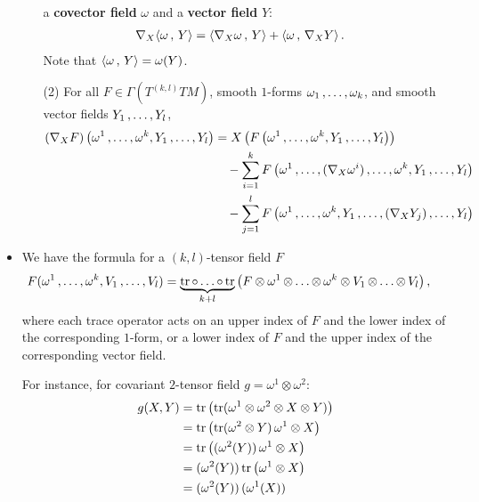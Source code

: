 \documentclass[11pt]{article}
\begin{document}
\begin{itemize}
\begin{proposition}
\begin{enumerate}
a \textbf{covector field} $\omega$ and a \textbf{vector field} $Y$:
\begin{align*}
\nabla_{X}{\left\langle \omega\,,\, Y \right\rangle} &= \left\langle \nabla_{X}{\omega}\,,\, Y \right\rangle + \left\langle \omega\,,\, \nabla_{X}{Y} \right\rangle.
\end{align*} Note that $\left\langle \omega\,,\, Y \right\rangle= \omega(Y)$.
\item[(2)] For all $F\in \Gamma(T^{(k,l)}TM)$, smooth $1$-forms $\omega_1 \,{,}\ldots{,}\, \omega_k$, and smooth vector fields $Y_1 \,{,}\ldots{,}\, Y_l$,
\begin{align}
(\nabla_{X}{F})\left(\omega^1 \,{,}\ldots{,}\, \omega^k, Y_1 \,{,}\ldots{,}\, Y_l\right) &= X\left(F\left(\omega^1 \,{,}\ldots{,}\, \omega^k, Y_1 \,{,}\ldots{,}\, Y_l\right)\right) \nonumber\\
&\quad -\sum_{i=1}^{k}F\left(\omega^1 \,{,}\ldots{,}\, (\nabla_{X}{\omega^i}) \,{,}\ldots{,}\, \omega^k, Y_1 \,{,}\ldots{,}\, Y_l\right) \nonumber\\
&\quad -\sum_{j=1}^{l} F\left(\omega^1 \,{,}\ldots{,}\, \omega^k, Y_1 \,{,}\ldots{,}\, (\nabla_{X}{Y_j}) \,{,}\ldots{,}\, Y_l\right) \label{eqn: connection_k_l_tensor}
\end{align}
\end{enumerate}
\end{proposition}

\item \begin{remark}
We have the formula for a $(k,l)$-tensor field $F$
\begin{align}
F(\omega^1 \,{,}\ldots{,}\, \omega^k, V_1 \,{,}\ldots{,}\, V_{l}) &= \underbrace{\text{tr}\,{\circ}\ldots{\circ}\, \text{tr}}_{k+l}\left(F \otimes \omega^1 \,{\otimes}\ldots{\otimes}\, \omega^k \otimes V_1 \,{\otimes}\ldots{\otimes}\, V_l\right), \label{eqn: tensor_trace_computation}
\end{align} where each trace operator acts on an upper index of $F$ and the lower index of the corresponding $1$-form, or a lower index of $F$ and the upper index of the corresponding vector field.

For instance, for covariant $2$-tensor field $g =\omega^1 \otimes \omega^2$:
\begin{align*}
g(X, Y) &= \text{tr}\left(\text{tr}(\omega^1 \otimes \omega^2 \otimes X \otimes Y )\right) \\
&= \text{tr}\left(\text{tr}(\omega^2 \otimes Y)\, \omega^1 \otimes X\right) \\
&= \text{tr}\left((\omega^2(Y))\, \omega^1 \otimes X\right) \\
&= (\omega^2(Y))\,\text{tr}\left(\omega^1 \otimes X\right) \\
&= (\omega^2(Y))\,(\omega^1(X))\,
\end{align*}
\end{remark}


\end{itemize}
\end{document}

